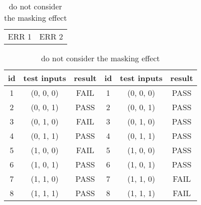 \documentclass{sig-alternate}
\begin{document}
\begin{table}
\centering
\caption{do not consider the masking effect}
\label{simple_idea}
\begin{tabular}{p{}|p{}} \hline
   ERR 1 & ERR 2
\end{tabular}

\begin{tabular}{c|c|c|c|c|c} \hline
id &test inputs & result & id&test inputs & result\\ \hline
1 &(0, 0, 0) &  FAIL &1&(0, 0, 0) &  PASS\\ \hline
2 &(0, 0, 1) &  PASS &2&(0, 0, 1) &  PASS\\ \hline
3 &(0, 1, 0) &  FAIL &3&(0, 1, 0) &  PASS\\ \hline
4 &(0, 1, 1) &  PASS &4&(0, 1, 1) &  PASS\\ \hline
5 &(1, 0, 0) &  FAIL &5&(1, 0, 0) &  PASS\\ \hline
6 &(1, 0, 1) &  PASS &6&(1, 0, 1) &  PASS\\ \hline
7 &(1, 1, 0) &  PASS &7&(1, 1, 0) &  FAIL\\ \hline
8 &(1, 1, 1) &  PASS &8&(1, 1, 1) &  FAIL\\ \hline
\hline\end{tabular}
\end{table}
\end{document}
